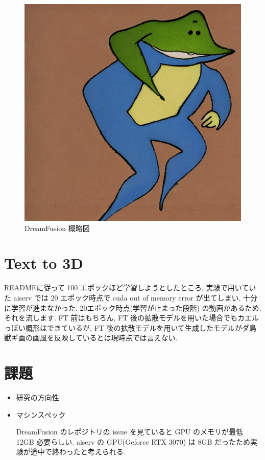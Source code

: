 \documentclass{jarticle}     %
\begin{document}
\begin{figure}[ht]
  \centering
  \includegraphics[width=120mm]{assets/AfterFT.eps}
  \vspace{-0.3cm}
  \caption{DreamFusion 概略図}
  \label{fig:AfterFT}
\end{figure}


\section{Text to 3D}
READMEに従って 100 エポックほど学習しようとしたところ, 実験で用いていた aiserv では 20 エポック時点で cuda out of memory error が出てしまい, 十分に学習が進まなかった.
20エポック時点(学習が止まった段階) の動画があるため, それを流します. 
FT 前はもちろん, FT 後の拡散モデルを用いた場合でもカエルっぽい概形はできているが, FT 後の拡散モデルを用いて生成したモデルがダ鳥獣ギ画の画風を反映しているとは現時点では言えない.

\section{課題}
\begin{itemize}
  \item 研究の方向性
  \item マシンスペック
  \par
  DreamFusion のレポジトリの issue を見ていると GPU のメモリが最低 12GB 必要らしい. aiserv の GPU(Geforce RTX 3070) は 8GB だったため実験が途中で終わったと考えられる.

\end{itemize}




\end{document}

